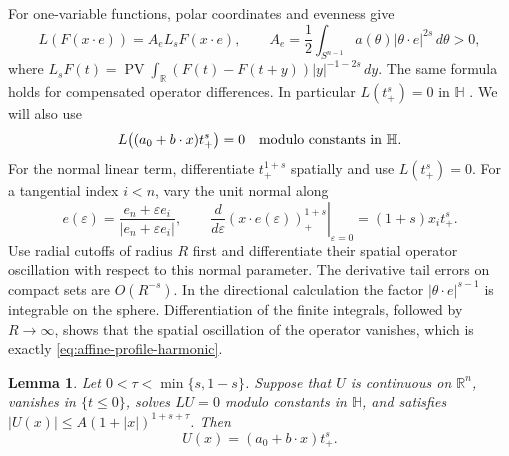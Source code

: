 \documentclass[11pt]{article}
\newtheorem{lemma}[theorem]{Lemma}
\numberwithin{equation}{section}
\newcommand{\R}{\mathbb R}
\newcommand{\Sn}{S^{n-1}}
\newcommand{\PV}{\operatorname{PV}}
\newcommand{\Hh}{\mathbb H}
\begin{document}
For one-variable functions, polar coordinates and evenness give
\begin{equation}\label{eq:one-dimensional}
 L(F(x\cdot e))=A_e L_sF(x\cdot e),\qquad
 A_e=\frac12\int_{\Sn}a(\theta)|\theta\cdot e|^{2s}\,d\theta>0,
\end{equation}
where
$L_sF(t)=\PV\int_\R(F(t)-F(t+y))|y|^{-1-2s}\,dy$.
The same formula holds for compensated operator differences.
In particular $L(t_+^s)=0$ in $\Hh$
\cite[Lemma 2.6.2 and Lemma B.1.5]{FRRO}.
We will also use
\begin{equation}\label{eq:affine-profile-harmonic}
 L\bigl((a_0+b\cdot x)t_+^s\bigr)=0
                 \quad\hbox{modulo constants in }\Hh.
\end{equation}
For the normal linear term, differentiate $t_+^{1+s}$ spatially and use
$L(t_+^s)=0$. For a tangential index $i<n$, vary the unit normal along
\[
 e(\varepsilon)=\frac{e_n+\varepsilon e_i}{|e_n+\varepsilon e_i|},
 \qquad
 \left.\frac{d}{d\varepsilon}(x\cdot e(\varepsilon))_+^{1+s}
                                      \right|_{\varepsilon=0}
                         =(1+s)x_i t_+^s.
\]
Use radial cutoffs of radius $R$ first and differentiate their spatial
operator oscillation with respect to this normal parameter. The derivative tail
errors on compact sets are $O(R^{-s})$. In the directional calculation the
factor $|\theta\cdot e|^{s-1}$ is integrable on the sphere. Differentiation
of the finite integrals, followed by $R\to\infty$, shows that the spatial
oscillation of the operator vanishes, which is exactly
\eqref{eq:affine-profile-harmonic}.

\begin{lemma}\label{lem:liouville}
Let $0<\tau<\min\{s,1-s\}$. Suppose that $U$ is continuous on $\R^n$,
vanishes in $\{t\leq0\}$, solves $LU=0$ modulo constants in $\Hh$, and
satisfies $|U(x)|\leq A(1+|x|)^{1+s+\tau}$. Then
\[
                  U(x)=(a_0+b\cdot x)t_+^s.
\]
\end{lemma}
\end{document}
